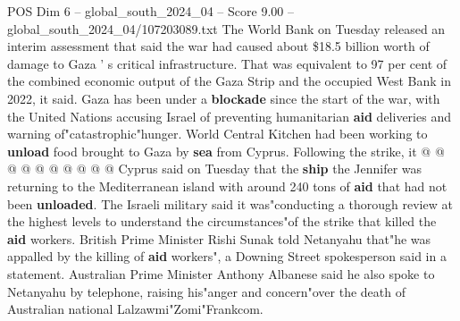 \begin{textsample}{POS Dim 6 – global\_south\_2024\_04 – Score 9.00 – global\_south\_2024\_04/107203089.txt}
The World Bank on Tuesday released an interim assessment that said the war had caused about \$18.5 billion worth of damage to Gaza ' s critical infrastructure.
That was equivalent to 97 per cent of the combined economic output of the Gaza Strip and the occupied West Bank in 2022, it said.
Gaza has been under a \textbf{blockade} since the start of the war, with the United Nations accusing Israel of preventing humanitarian \textbf{aid} deliveries and warning of"catastrophic"hunger.
World Central Kitchen had been working to \textbf{unload} food brought to Gaza by \textbf{sea} from Cyprus.
Following the strike, it @ @ @ @ @ @ @ @ @ @ Cyprus said on Tuesday that the \textbf{ship} the Jennifer was returning to the Mediterranean island with around 240 tons of \textbf{aid} that had not been \textbf{unloaded}.
The Israeli military said it was"conducting a thorough review at the highest levels to understand the circumstances"of the strike that killed the \textbf{aid} workers.
British Prime Minister Rishi Sunak told Netanyahu that"he was appalled by the killing of \textbf{aid} workers", a Downing Street spokesperson said in a statement.
Australian Prime Minister Anthony Albanese said he also spoke to Netanyahu by telephone, raising his"anger and concern"over the death of Australian national Lalzawmi"Zomi"Frankcom.

\end{textsample}
